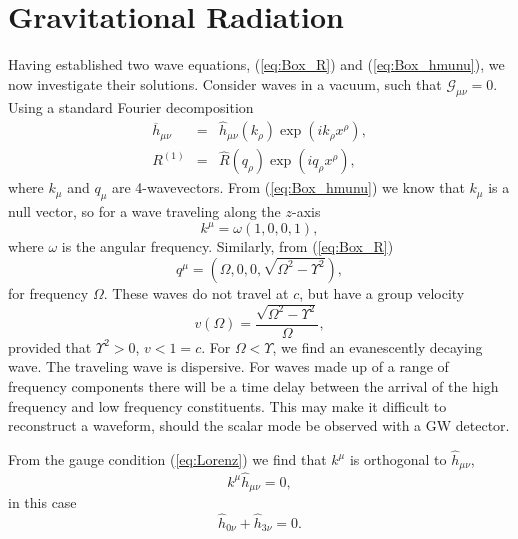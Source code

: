 \documentclass[aps,prd,amsfonts,amssymb,amsmath,nofootinbib,reprint,showpacs]{revtex4-1}
\newcommand{\eqnref}[1]{(\ref{eq:#1})}
\begin{document}
\section{Gravitational Radiation\label{sec:Rad}}

Having established two wave equations, \eqnref{Box_R} and \eqnref{Box_hmunu}, we now investigate their solutions. Consider waves in a vacuum, such that $\mathcal{G}_{\mu\nu} = 0$. Using a standard Fourier decomposition
\begin{eqnarray}
\overline{h}_{\mu\nu} & = & \widehat{h}_{\mu\nu}(k_\rho) \exp\left(ik_\rho x^\rho\right),\\
R^{(1)} & = & \widehat{R}(q_\rho) \exp\left(iq_\rho x^\rho\right),
\end{eqnarray}
where $k_\mu$ and $q_\mu$ are 4-wavevectors. From \eqnref{Box_hmunu} we know that $k_\mu$ is a null vector, so for a wave traveling along the $z$-axis
\begin{equation}
k^\mu = \omega(1, 0, 0, 1),
\end{equation}
where $\omega$ is the angular frequency. Similarly, from \eqnref{Box_R}
\begin{equation}
q^\mu = \left(\Omega, 0, 0, \sqrt{\Omega^2 - \Upsilon^2}\right),
\label{eq:Ricci_q}
\end{equation}
for frequency $\Omega$. These waves do not travel at $c$, but have a group velocity
\begin{equation}
v(\Omega) = \frac{\sqrt{\Omega^2 - \Upsilon^2}}{\Omega},
\end{equation}
provided that $\Upsilon^2 > 0$, $v < 1 = c$. For $\Omega < \Upsilon$, we find an evanescently decaying wave. The traveling wave is dispersive. For waves made up of a range of frequency components there will be a time delay between the arrival of the high frequency and low frequency constituents. This may make it difficult to reconstruct a waveform, should the scalar mode be observed with a GW detector.

From the gauge condition \eqnref{Lorenz} we find that $k^\mu$ is orthogonal to $\widehat{h}_{\mu\nu}$,
\begin{equation}
k^\mu\widehat{h}_{\mu\nu} = 0,
\end{equation}
in this case
\begin{equation}
\widehat{h}_{0\nu} + \widehat{h}_{3\nu} = 0.
\label{eq:Transverse}
\end{equation}
\end{document}
